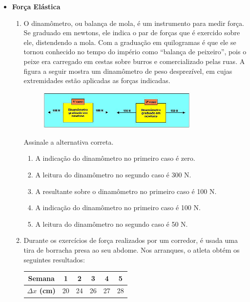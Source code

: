 \documentclass[12pt,letterpaper,fleqn]{article}
\begin{document}
\begin{itemize}
    \item \textbf{Força Elástica}
    
    \begin{enumerate}
        \item O dinamômetro, ou balança de mola, é um instrumento para medir força. Se graduado em newtons, ele indica o par de forças que é exercido sobre ele, distendendo a mola. Com a graduação em quilogramas é que ele se tornou conhecido no tempo do império como “balança de peixeiro”, pois o peixe era carregado em cestas sobre burros e comercializado pelas ruas. A figura a seguir mostra um dinamômetro de peso desprezível, em cujas extremidades estão aplicadas as forças indicadas.
        \begin{figure}[h]
            \centering
            \includegraphics[width=0.8\textwidth]{ex_1.jpg}
        \end{figure}
        Assinale a alternativa correta.
        \begin{enumerate}
            \item A indicação do dinamômetro no primeiro caso é zero.
            \item A leitura do dinamômetro no segundo caso é 300 N.
            \item A resultante sobre o dinamômetro no primeiro caso é 100 N.
            \item A indicação do dinamômetro no primeiro caso é 100 N.
            \item A leitura do dinamômetro no segundo caso é 50 N.
        \end{enumerate}
        
        \item Durante os exercícios de força realizados por um corredor, é usada uma tira de borracha presa ao seu abdome. Nos arranques, o atleta obtém os seguintes resultados:
        \begin{table}[h]
            \centering
            \begin{tabular}{|c|c|c|c|c|c|}
            \hline
                 \textbf{Semana}&1&2&3&4&5  \\\hline
                 \textbf{$\Delta x$ (cm)}& 20&24&26&27&28  
                 \\ \hline
            \end{tabular}
        \end{table}
        

\end{enumerate}
\end{itemize}
\end{document}
